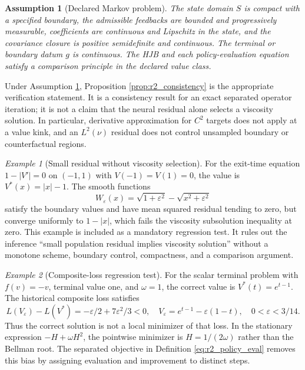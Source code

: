 \documentclass[ecta]{econsocart}
\theoremstyle{plain}
\newtheorem{assumption}{Assumption}
\theoremstyle{remark}
\newtheorem{example}{Example}
\begin{document}
\begin{assumption}[Declared Markov problem]
\label{ass:r2_markov}
The state domain $S$ is compact with a specified boundary, the admissible feedbacks are bounded and progressively measurable, coefficients are continuous and Lipschitz in the state, and the covariance closure is positive semidefinite and continuous. The terminal or boundary datum $g$ is continuous. The HJB and each policy-evaluation equation satisfy a comparison principle in the declared value class.
\end{assumption}

Under Assumption \ref{ass:r2_markov}, Proposition \ref{prop:r2_consistency} is the appropriate verification statement. It is a consistency result for an exact separated operator iteration; it is not a claim that the neural residual alone selects a viscosity solution. In particular, derivative approximation for $C^2$ targets does not apply at a value kink, and an $L^2(\nu)$ residual does not control unsampled boundary or counterfactual regions.

\begin{example}[Small residual without viscosity selection]
\label{ex:r2_viscosity}
For the exit-time equation $1-|V'|=0$ on $(-1,1)$ with $V(-1)=V(1)=0$, the value is $V^*(x)=|x|-1$. The smooth functions
\[
W_\varepsilon(x)=\sqrt{1+\varepsilon^2}-\sqrt{x^2+\varepsilon^2}
\]
satisfy the boundary values and have mean squared residual tending to zero, but converge uniformly to $1-|x|$, which fails the viscosity subsolution inequality at zero. This example is included as a mandatory regression test. It rules out the inference ``small population residual implies viscosity solution'' without a monotone scheme, boundary control, compactness, and a comparison argument.
\end{example}

\begin{example}[Composite-loss regression test]
For the scalar terminal problem with $f(v)=-v$, terminal value one, and $\omega=1$, the correct value is $V^*(t)=e^{t-1}$. The historical composite loss satisfies
\[
L(V_\varepsilon)-L(V^*)=-\varepsilon/2+7\varepsilon^2/3<0,
\quad V_\varepsilon=e^{t-1}-\varepsilon(1-t),\quad 0<\varepsilon<3/14.
\]
Thus the correct solution is not a local minimizer of that loss. In the stationary expression $-H+\omega H^2$, the pointwise minimizer is $H=1/(2\omega)$ rather than the Bellman root. The separated objective in Definition \ref{eq:r2_policy_eval} removes this bias by assigning evaluation and improvement to distinct steps.
\end{example}
\end{document}
